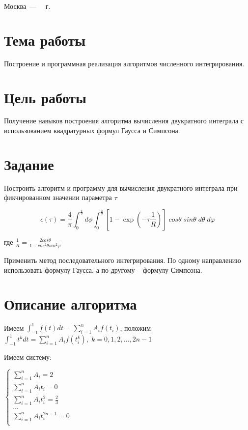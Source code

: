 \documentclass[a4paper,12pt]{article}
\begin{document}
\begin{center}
	\vfill
	Москва~---~\the\year
~г.
\end{center}
\clearpage
\section{Тема работы}

\noindent Построение и программная реализация алгоритмов численного интегрирования.
\section{Цель работы}

\noindent Получение навыков построения алгоритма вычисления двукратного интеграла с использованием квадратурных формул Гаусса и Симпсона.
\section{Задание}
\noindent Построить алгоритм и программу для вычисления двукратного интеграла при фикчированном значении параметра $\tau$

$$\epsilon (\tau) = \frac{4}{\pi} \int_{0}^{\frac{\pi}{2}} d\phi \int_{0}^{\frac{\pi}{2}} [1 - \exp(-\tau \frac{1}{R})] \; cos\theta \; sin\theta \; d\theta \; d\varphi  $$\newline

\noindent \large{где $ \frac{1}{R} = \frac{2 cos\theta}{1 - cos^2\theta sin^2\varphi}$\newline}

\noindent Применить метод последовательного интегрирования. По одному направлению использовать формулу Гаусса, а по другому -- формулу Симпсона.

\section{Описание алгоритма}
	
\noindent Имеем $\int_{-1}^{1} f(t) dt = \sum_{i = 1}^{n}A_{i}f(t_{i})$, положим $\int_{-1}^{1} t^k dt = \sum_{i = 1}^{n}A_{i}f(t_{i}^k), \; k = 0, 1, 2,..., 2n-1$\newline

\noindent Имеем систему:\newline


$\begin{cases}
	\sum_{i = 1}^{n} A_{i} = 2 \\
	\sum_{i = 1}^{n} A_{i} t_{i} = 0 \\
	\sum_{i = 1}^{n} A_{i} t_{i}^2 = \frac{2}{3} \\
	\dots \\
	\sum_{i = 1}^{n} A_{i} t_{i}^{2n - 1} = 0 \\
\end{cases}$\newline\newline
\end{document}

